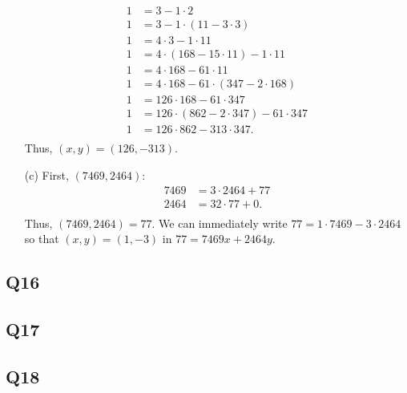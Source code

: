 \documentclass[12pt]{article}
\numberwithin{theorem}{section}
\numberwithin{equation}{section}
\numberwithin{remark}{section}
\numberwithin{definition}{section}
\numberwithin{theorem}{section}
\numberwithin{lemma}{section}
\numberwithin{example}{section}
\begin{document}
\begin{itemize}
{	\begin{align*}
		1 & = 3 - 1\cdot2\\
		1 & = 3 - 1\cdot(11-3\cdot3)\\
		1 & = 4\cdot 3 - 1\cdot11\\
		1 & = 4\cdot (168-15\cdot11) - 1\cdot11\\
		1 & = 4\cdot 168 - 61\cdot11\\
		1 & = 4\cdot 168 - 61\cdot(347-2\cdot168)\\
		1 & = 126\cdot 168 - 61\cdot 347\\
		1 & = 126\cdot (862-2\cdot347) - 61\cdot 347\\
		1 & = 126\cdot 862 - 313\cdot 347.\\
	\end{align*}
	Thus, $(x,y)=(126,-313)$.}
	\item[(c)]{First, $(7469,2464)$:
	\begin{align*}
		7469 & = 3\cdot2464 + 77\\
		2464 & = 32\cdot77 + 0.\\
	\end{align*}
	Thus, $(7469,2464)=77$. We can immediately write $77=1\cdot7469-3\cdot2464$ so that $(x,y)=(1,-3)$ in $77=7469x+2464y$.}
\end{itemize}

\subsection{Q16}

\subsection{Q17}

\subsection{Q18}
\end{document}
